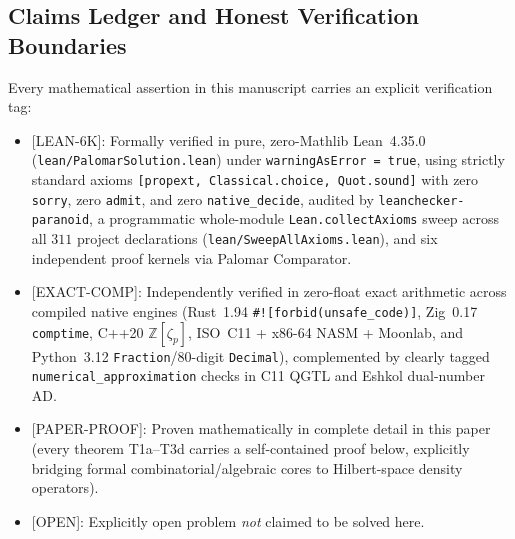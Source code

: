 \documentclass[11pt,reqno]{amsart}
\theoremstyle{definition}
\newcommand{\ZZ}{\mathbb{Z}}
\newcommand{\lid}[1]{{\footnotesize\nolinkurl{#1}}}
\newcommand{\tagL}{\textsf{\footnotesize[LEAN-6K]}}
\newcommand{\tagE}{\textsf{\footnotesize[EXACT-COMP]}}
\newcommand{\tagP}{\textsf{\footnotesize[PAPER-PROOF]}}
\newcommand{\tagO}{\textsf{\footnotesize[OPEN]}}
\begin{document}
\subsection{Claims Ledger and Honest Verification Boundaries}
\label{sec:claims-ledger}

Every mathematical assertion in this manuscript carries an explicit verification tag:
\begin{itemize}[leftmargin=2em]
  \item \tagL: Formally verified in pure, zero-Mathlib Lean~4.35.0
    (\lid{lean/PalomarSolution.lean}) under \lid{warningAsError = true}, using strictly
    standard axioms \lid{[propext, Classical.choice, Quot.sound]} with zero \lid{sorry},
    zero \lid{admit}, and zero \lid{native_decide}, audited by
    \lid{leanchecker-paranoid}, a programmatic whole-module \lid{Lean.collectAxioms}
    sweep across all $311$ project declarations (\lid{lean/SweepAllAxioms.lean}), and
    six independent proof kernels via Palomar Comparator.
  \item \tagE: Independently verified in zero-float exact arithmetic across compiled
    native engines (Rust~1.94 {\footnotesize\texttt{\#![forbid(unsafe\_code)]}}, Zig~0.17
    \lid{comptime}, C++20 $\ZZ[\zeta_p]$, ISO~C11 + x86-64 NASM + Moonlab, and
    Python~3.12 \lid{Fraction}/80-digit \lid{Decimal}), complemented by clearly tagged
    \lid{numerical_approximation} checks in C11 QGTL and Eshkol dual-number AD.
  \item \tagP: Proven mathematically in complete detail in this paper (every theorem
    T1a--T3d carries a self-contained proof below, explicitly bridging formal
    combinatorial/algebraic cores to Hilbert-space density operators).
  \item \tagO: Explicitly open problem \emph{not} claimed to be solved here.
\end{itemize}
\end{document}
